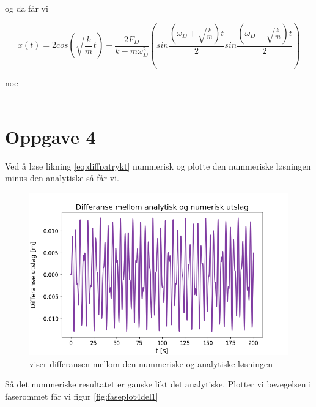 \documentclass[norsk,a4paper,12pt]{article}
\begin{document}
og da får vi

\begin{equation}
	x(t) = 2 cos \left(\sqrt{\frac{k}{m}}t \right) - \frac{2F_D}{k-m\omega_D^2} \left(sin\frac{\left(\omega_D + \sqrt{\frac{k}{m}} \right)t}{2} sin\frac{\left(\omega_D - \sqrt{\frac{k}{m}} \right)t}{2} \right)
\end{equation}

noe
\\
\\

\section*{Oppgave 4}
Ved å løse likning \ref{eq:diffpatrykt} nummerisk og plotte den nummeriske løsningen minus den analytiske så får vi.

\begin{figure}[h]
\begin{center}
\includegraphics[scale=0.5]{Oppgave4_differanse.png}
\caption{viser differansen mellom den nummeriske og analytiske løsningen}
\label{fig:differanseplot}
\end{center}
\end{figure}

Så det nummeriske resultatet er ganske likt det analytiske. Plotter vi bevegelsen i faserommet får vi figur \ref{fig:faseplot4del1}
\end{document}
